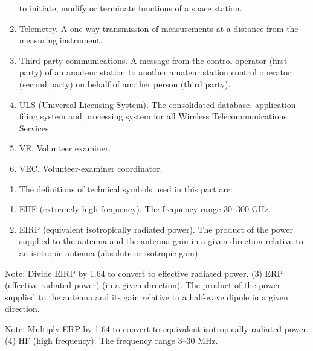 \documentclass[
  letterpaper,
  DIV=11,
  numbers=noendperiod]{scrreport}
\providecommand{\tightlist}{%
  \setlength{\itemsep}{0pt}\setlength{\parskip}{0pt}}\usepackage{longtable,booktabs,array}
\begin{document}
\begin{enumerate}
  to initiate, modify or terminate functions of a space station.
\item
  Telemetry. A one-way transmission of measurements at a distance from
  the measuring instrument.
\item
  \leavevmode{}%
  Third party communications. A message from the control operator (first
  party) of an amateur station to another amateur station control
  operator (second party) on behalf of another person (third party).
\item
  ULS (Universal Licensing System). The consolidated database,
  application filing system and processing system for all Wireless
  Telecommunications Services.
\item
  VE. Volunteer examiner.
\item
  VEC. Volunteer-examiner coordinator.
\end{enumerate}

\begin{enumerate}
\def\labelenumi{(\alph{enumi})}
\setcounter{enumi}{1}
\tightlist
\item
  The definitions of technical symbols used in this part are:
\end{enumerate}

\begin{enumerate}
\def\labelenumi{(\arabic{enumi})}
\item
  EHF (extremely high frequency). The frequency range 30--300 GHz.
\item
  EIRP (equivalent isotropically radiated power). The product of the
  power supplied to the antenna and the antenna gain in a given
  direction relative to an isotropic antenna (absolute or isotropic
  gain).
\end{enumerate}

Note: Divide EIRP by 1.64 to convert to effective radiated power. (3)
ERP (effective radiated power) (in a given direction). The product of
the power supplied to the antenna and its gain relative to a half-wave
dipole in a given direction.

Note: Multiply ERP by 1.64 to convert to equivalent isotropically
radiated power. (4) HF (high frequency). The frequency range 3--30 MHz.
\end{document}
